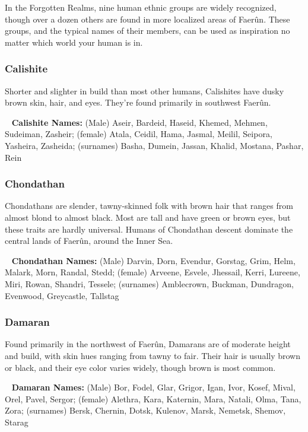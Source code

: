 In the Forgotten Realms, nine human ethnic groups are widely recognized, though over a dozen others are found in more localized areas of Faerûn. These groups, and the typical names of their members, can be used as inspiration no matter which world your human is in.

\subsubsection{Calishite}
Shorter and slighter in build than most other humans, Calishites have dusky brown skin, hair, and eyes. They’re found primarily in southwest Faerûn.

\ \newline
\noindent \textbf{Calishite Names:} \hangindent=0.3cm (Male) Aseir, Bardeid, Haseid, Khemed, Mehmen, Sudeiman, Zasheir; (female) Atala, Ceidil, Hama, Jasmal, Meilil, Seipora, Yasheira, Zasheida; (surnames) Basha, Dumein, Jassan, Khalid, Mostana, Pashar, Rein

\subsubsection{Chondathan}
Chondathans are slender, tawny-skinned folk with brown hair that ranges from almost blond to almost black. Most are tall and have green or brown eyes, but these traits are hardly universal. Humans of Chondathan descent dominate the central lands of Faerûn, around the Inner Sea.

\ \newline
\noindent \textbf{Chondathan Names:} \hangindent=0.3cm (Male) Darvin, Dorn, Evendur, Gorstag, Grim, Helm, Malark, Morn, Randal, Stedd; (female) Arveene, Esvele, Jhessail, Kerri, Lureene, Miri, Rowan, Shandri, Tessele; (surnames) Amblecrown, Buckman, Dundragon, Evenwood, Greycastle, Tallstag

\subsubsection{Damaran}
Found primarily in the northwest of Faerûn, Damarans are of moderate height and build, with skin hues ranging from tawny to fair. Their hair is usually brown or black, and their eye color varies widely, though brown is most common.

\ \newline
\noindent \textbf{Damaran Names:} \hangindent=0.3cm (Male) Bor, Fodel, Glar, Grigor, Igan, Ivor, Kosef, Mival, Orel, Pavel, Sergor; (female) Alethra, Kara, Katernin, Mara, Natali, Olma, Tana, Zora; (surnames) Bersk, Chernin, Dotsk, Kulenov, Marsk, Nemetsk, Shemov, Starag


